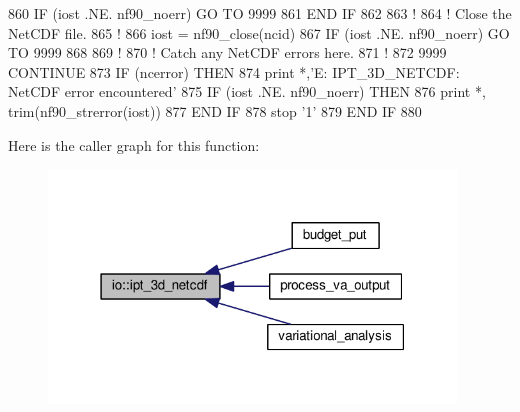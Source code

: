 \begin{DoxyCode}
860         \textcolor{keywordflow}{IF} (iost .NE. nf90\_noerr) \textcolor{keywordflow}{GO TO} 9999
861 \textcolor{keywordflow}{    END IF}
862 
863     \textcolor{comment}{!}
864     \textcolor{comment}{! Close the NetCDF file.}
865     \textcolor{comment}{!}
866     iost    = nf90\_close(ncid)
867     \textcolor{keywordflow}{IF} (iost .NE. nf90\_noerr) \textcolor{keywordflow}{GO TO} 9999
868 
869     \textcolor{comment}{!}
870     \textcolor{comment}{! Catch any NetCDF errors here.}
871     \textcolor{comment}{!}
872     9999 \textcolor{keywordflow}{CONTINUE}
873     \textcolor{keywordflow}{IF} (ncerror) \textcolor{keywordflow}{THEN}
874         print *,\textcolor{stringliteral}{'E: IPT\_3D\_NETCDF: NetCDF error encountered'}
875         \textcolor{keywordflow}{IF} (iost .NE. nf90\_noerr) \textcolor{keywordflow}{THEN}
876             print *, trim(nf90\_strerror(iost))
877 \textcolor{keywordflow}{        END IF}
878         stop \textcolor{stringliteral}{'1'}
879 \textcolor{keywordflow}{    END IF}
880 
\end{DoxyCode}


Here is the caller graph for this function\+:\nopagebreak
\begin{figure}[H]
\begin{center}
\leavevmode
\includegraphics[width=307pt]{namespaceio_a0f9f8edb9a7173638e450ce3c4db7844_icgraph}
\end{center}
\end{figure}


